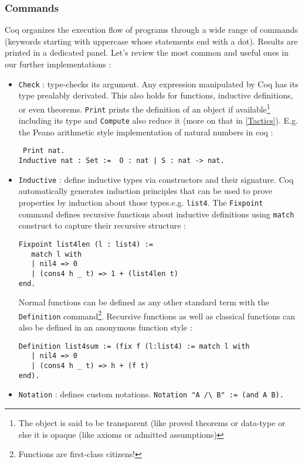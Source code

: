 \documentclass{article}
\begin{document}
        \subsubsection{Commands}
        Coq organizes the execution flow of programs through a wide range of commands (keywords starting with uppercase whose statements end with a dot). Results are printed in a dedicated panel. Let's review the most common and useful ones in our further implementations :
        \begin{itemize}
            \item \texttt{Check} : type-checks its argument. Any expression manipulated by Coq has its type prealably derivated. This also holds for functions, inductive definitions, or even theorems. \texttt{Print} prints the definition of an object if available\footnote{The object is said to be transparent (like proved theorems or data-type or else it is opaque (like axioms or admitted assumptions)} including its type and \texttt{Compute} also reduce it (more on that in \ref{Tactics}). E.g. the Peano arithmetic style implementation of natural numbers in coq :
            \begin{verbatim} Print nat.
Inductive nat : Set :=  O : nat | S : nat -> nat. \end{verbatim}
            \item  \texttt{Inductive} : define inductive types via constructors and their signature. Coq automatically generates induction principles that can be used to prove properties by induction about those types.e.g. \texttt{list4}.
            The \texttt{Fixpoint} command defines recursive functions about inductive definitions using \texttt{match} construct to capture their recursive structure :
            \begin{verbatim}
Fixpoint list4len (l : list4) :=
   match l with
   | nil4 => 0
   | (cons4 h _ t) => 1 + (list4len t)
end.\end{verbatim}
            Normal functions can be defined as any other standard term with the \texttt{Definition} command\footnote{Functions are first-class citizens!}. Recursive functions as well as classical functions can also be defined in an anonymous function style :
            \begin{verbatim}Definition list4sum := (fix f (l:list4) := match l with
   | nil4 => 0
   | (cons4 h _ t) => h + (f t)
end).\end{verbatim}

            \item \texttt{Notation} : defines custom notations. \verb|Notation "A /\ B" := (and A B).|


\end{itemize}
\end{document}
